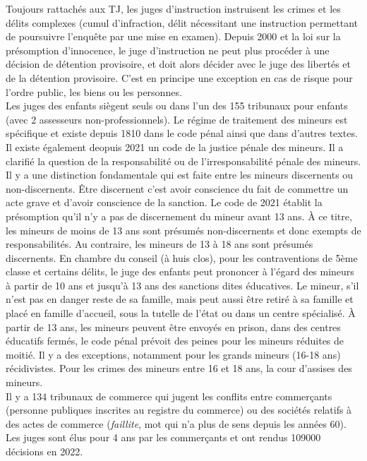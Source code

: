 \documentclass[math]{cours}
\begin{document}
Toujours rattachés aux TJ, les juges d'instruction instruisent les crimes et les délits complexes (cumul d'infraction, délit nécessitant une instruction permettant de poursuivre l'enquête par une mise en examen).
Depuis 2000 et la loi sur la présomption d'innocence, le juge d'instruction ne peut plus procéder à une décision de détention provisoire, et doit alors décider avec le juge des libertés et de la détention provisoire.
C'est en principe une exception en cas de risque pour l'ordre public, les biens ou les personnes.\\
Les juges des enfants siègent seuls ou dans l'un des 155 tribunaux pour enfants (avec 2 assesseurs non-professionnels).
Le régime de traitement des mineurs est spécifique et existe depuis 1810 dans le code pénal ainsi que dans d'autres textes.
Il existe également deopuis 2021 un code de la justice pénale des mineurs.
Il a clarifié la question de la responsabilité ou de l'irresponsabilité pénale des mineurs.
Il y a une distinction fondamentale qui est faite entre les mineurs discernents ou non-discernents.
Être discernent c'est avoir conscience du fait de commettre un acte grave et d'avoir conscience de la sanction.
Le code de 2021 établit la présomption qu'il n'y a pas de discernement du mineur avant 13 ans.
À ce titre, les mineurs de moins de 13 ans sont présumés non-discernents et donc exempts de responsabilités.
Au contraire, les mineurs de 13 à 18 ans sont présumés discernents.
En chambre du conseil (à huis clos), pour les contraventions de 5ème classe et certains délits, le juge des enfants peut prononcer à l'égard des mineurs à partir de 10 ans et jusqu'à 13 ans des sanctions dites éducatives.
Le mineur, s'il n'est pas en danger reste de sa famille, mais peut aussi être retiré à sa famille et placé en famille d'accueil, sous la tutelle de l'état ou dans un centre spécialisé.
À partir de 13 ans, les mineurs peuvent être envoyés en prison, dans des centres éducatifs fermés, le code pénal prévoit des peines pour les mineurs réduites de moitié.
Il y a des exceptions, notamment pour les grands mineurs (16-18 ans) récidivistes.
Pour les crimes des mineurs entre 16 et 18 ans, la cour d'assises des mineurs. \\
Il y a 134 tribunaux de commerce qui jugent les conflits entre commerçants (personne publiques inscrites au registre du commerce) ou des sociétés relatifs à des actes de commerce (\textit{faillite}, mot qui n'a plus de sens depuis les années 60).
Les juges sont élus pour 4 ans par les commerçants et ont rendus 109000 décisions en 2022.\\
\end{document}
